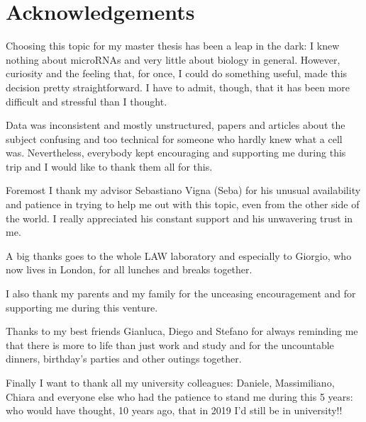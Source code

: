 \chapter*{Acknowledgements}

Choosing this topic for my master thesis has been a leap in the dark: I knew nothing about microRNAs and very little about biology in general. However, curiosity and the feeling that, for once, I could do something useful, made this decision pretty straightforward. I have to admit, though, that it has been more difficult and stressful than I thought.

Data was inconsistent and mostly unstructured, papers and articles about the subject confusing and too technical for someone who hardly knew what a cell was. Nevertheless, everybody kept encouraging and supporting me during this trip and I would like to thank them all for this.

Foremost I thank my advisor Sebastiano Vigna (Seba) for his unusual availability and patience in trying to help me out with this topic, even from the other side of the world. I really appreciated his constant support and his unwavering trust in me.  

A big thanks goes to the whole LAW laboratory and especially to Giorgio, who now lives in London, for all lunches and breaks together.

I also thank my parents and my family for the unceasing encouragement and for supporting me during this venture.

Thanks to my best friends Gianluca, Diego and Stefano for always reminding me that there is more to life than just work and study and for the uncountable dinners, birthday's parties and other outings together.

Finally I want to thank all my university colleagues: Daniele, Massimiliano, Chiara and everyone else who had the patience to stand me during this 5 years: who would have thought, 10 years ago, that in 2019 I'd still be in university!! 